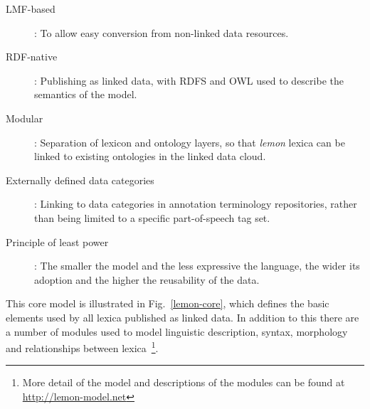 \begin{description} 
\item[LMF-based]: To allow easy conversion from non-linked data resources.
\item[RDF-native]: Publishing as linked data, with RDFS and OWL used to describe
  the semantics of the model.
\item[Modular]: Separation of lexicon and ontology layers, so that \emph{lemon} lexica can be linked to existing ontologies
in the linked data cloud.
\item[Externally defined data categories]: Linking to data categories in
  annotation terminology repositories, rather than being limited to a specific part-of-speech tag set.
\item[Principle of least power]: The smaller the model and the less expressive the language, 
	the wider its adoption and the higher the reusability of the
	data\cite{shadbolt2006semantic}.
\end{description}

This core model 
is illustrated in Fig.\ \ref{lemon-core}, which 
defines the
basic elements used by all lexica published as linked data. In addition to this there
are a number of modules used to model linguistic description, syntax, morphology 
and relationships between lexica~\footnote{More detail of the model and descriptions of
the modules can be found at \url{http://lemon-model.net}}.


